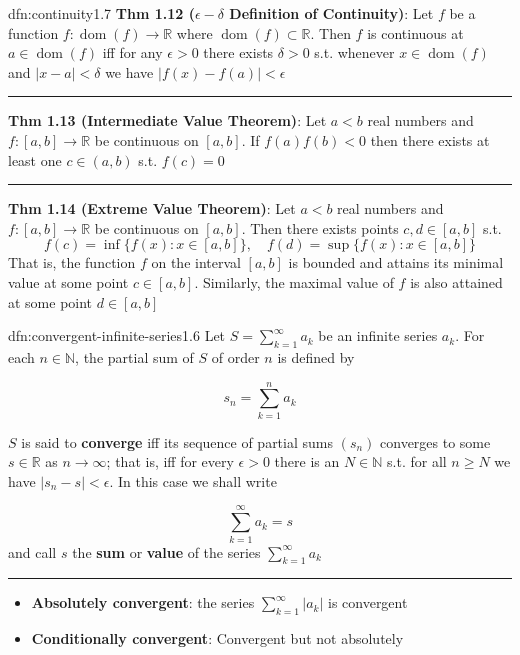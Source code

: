 \documentclass[landscape, 8pt]{extarticle}
\DeclareMathOperator{\dom}{dom}
\begin{document}
\begin{multicols}{3}
\begin{dfn}[Continuity]{dfn:continuity}{1.7}
	\textbf{Thm 1.12 ($\epsilon-\delta$ Definition of Continuity)}: Let $f$ be a function $f : \dom(f) \to \mathbb{R}$ where $\dom(f) \subset \mathbb{R}$. Then $f$ is continuous at $a\in \dom(f)$ iff for any $\epsilon > 0$ there exists $\delta > 0$ s.t. whenever $x\in\dom(f)$ and $\lvert x - a \rvert < \delta$ we have $\lvert f(x) - f(a) \rvert < \epsilon$

	\noindent\rule{\textwidth}{0.2pt}

	\textbf{Thm 1.13 (Intermediate Value Theorem)}: Let $a < b$ real numbers and $f : [a, b] \to \mathbb{R}$ be continuous on $[a, b]$. If $f(a)f(b)<0$ then there exists at least one $c\in (a, b)$ s.t. $f(c) = 0$

	\noindent\rule{\textwidth}{0.2pt}

	\textbf{Thm 1.14 (Extreme Value Theorem)}: Let $a < b$ real numbers and $f : [a, b]\to \mathbb{R}$ be continuous on $[a, b]$. Then there exists points $c, d\in [a,b]$ s.t.
	\[f(c) = \inf \{f(x) : x\in [a, b]\}, \quad f(d) = \sup \{f(x) : x\in [a, b]\}\]
	That is, the function $f$ on the interval $[a, b]$ is bounded and attains its minimal value at some point $c\in [a,b]$. Similarly, the maximal value of $f$ is also attained at some point $d\in [a,b]$
\end{dfn}


\begin{dfn}{dfn:convergent-infinite-series}{1.6}
	Let $S=\sum_{k=1}^{\infty}a_{k}$ be an infinite series $a_{k}$. For each $n\in\mathbb{N}$, the partial sum of $S$ of order $n$ is defined by

	\vspace{-8pt}
	\[s_{n} = \sum_{k=1}^{n} a_{k}\]

	$S$ is said to \textbf{converge} iff its sequence of partial sums $(s_{n})$ converges to some $s \in\mathbb{R}$ as $n\to\infty$; that is, iff for every $\epsilon>0$ there is an $N\in\mathbb{N}$ s.t. for all $n\ge N$ we have $\lvert s_{n}-s \rvert < \epsilon$. In this case we shall write

	\vspace{-7pt}
	\[\sum_{k=1}^{\infty} a_{k} = s\]
	\vspace{-3pt}
	and call $s$ the \textbf{sum} or \textbf{value} of the series $\sum_{k=1}^{\infty}a_{k}$

	\noindent\rule{\textwidth}{0.2pt}

	\vspace{-5pt}
	\begin{itemize}[leftmargin=*]
	    \setlength\itemsep{0em}
	    \item \textbf{Absolutely convergent}: the series $\sum_{k = 1}^{\infty} \lvert a_{k} \rvert$ is convergent
	    \item \textbf{Conditionally convergent}: Convergent but not absolutely
	\end{itemize}


\end{dfn}
\end{multicols}
\end{document}

